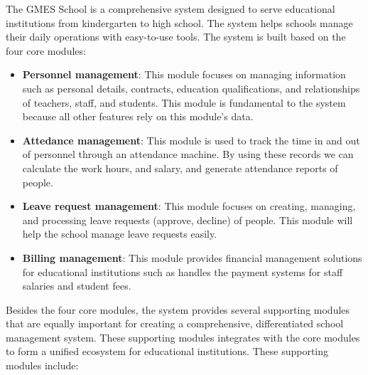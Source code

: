 \indent 
    
    The GMES School is a comprehensive system designed to serve educational institutions from kindergarten to high school. The system helps schools manage their daily operations with easy-to-use tools. The system is built based on the four core modules:
    \begin{itemize}[itemsep=-0.1cm, topsep=0.1cm]
        \item \textbf{Personnel management}: This module focuses on managing information such as personal details, contracts, education qualifications, and relationships of teachers, staff, and students. This module is fundamental to the system because all other features rely on this module's data.
        \item \textbf{Attedance management}: This module is used to track the time in and out of personnel through an attendance machine. By using these records we can calculate the work hours, and salary, and generate attendance reports of people.
        \item \textbf{Leave request management}: This module focuses on creating, managing, and processing leave requests (approve, decline) of people. This module will help the school manage leave requests easily.
        \item \textbf{Billing management}: This module provides financial management solutions for educational institutions such as handles the payment systems for staff salaries and student fees.
    \end{itemize}
    Besides the four core modules, the system provides several supporting modules that are equally important for creating a comprehensive, differentiated school management system. These supporting modules integrates with the core modules to form a unified ecosystem for educational institutions. These supporting modules include:
